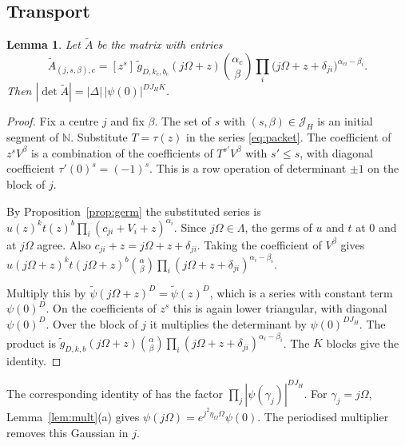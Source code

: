 \documentclass[11pt]{amsart}
\newtheorem{lemma}[theorem]{Lemma}
\theoremstyle{definition}
\theoremstyle{remark}
\numberwithin{equation}{section}
\newcommand{\N}{\mathbb N}
\newcommand{\cJ}{\mathcal J}
\newcommand{\tpsi}{\widetilde\psi}
\newcommand{\tg}{\widetilde g}
\newcommand{\tA}{\widetilde A}
\begin{document}
\subsection{Transport}

\begin{lemma}\label{lem:transport}
Let $\tA$ be the matrix with entries
\[
 \tA_{(j,s,\beta),c}=[z^s]\,\tg_{D,k_c,b_c}(j\Omega+z)\binom{\alpha_c}\beta\prod_i
 \bigl(j\Omega+z+\delta_{ji}\bigr)^{\alpha_{ci}-\beta_i}.
\]
Then $|\det\tA|=|\Delta|\,|\psi(0)|^{DJ_HK}$.
\end{lemma}

\begin{proof}
Fix a centre $j$ and fix $\beta$. The set of $s$ with $(s,\beta)\in\cJ_H$ is an initial segment of $\N$.
Substitute $T=\tau(z)$ in the series \eqref{eq:packet}. The coefficient of $z^sV^\beta$ is a combination of the
coefficients of $T^{s'}V^\beta$ with $s'\le s$, with diagonal coefficient $\tau'(0)^s=(-1)^s$. This is a row
operation of determinant $\pm1$ on the block of $j$.

By Proposition~\ref{prop:germ} the substituted series is
$u(z)^{k}t(z)^{b}\prod_i(c_{ji}+V_i+z)^{\alpha_i}$. Since $j\Omega\in\Lambda$, the germs of $u$ and $t$ at
$0$ and at $j\Omega$ agree. Also $c_{ji}+z=j\Omega+z+\delta_{ji}$. Taking the coefficient of $V^\beta$ gives
$u(j\Omega+z)^kt(j\Omega+z)^b\binom\alpha\beta\prod_i(j\Omega+z+\delta_{ji})^{\alpha_i-\beta_i}$.

Multiply this by $\tpsi(j\Omega+z)^D=\tpsi(z)^D$, which is a series with constant term $\psi(0)^D$. On the
coefficients of $z^s$ this is again lower triangular, with diagonal $\psi(0)^D$. Over the block of $j$ it
multiplies the determinant by $\psi(0)^{DJ_H}$. The product is
$\tg_{D,k,b}(j\Omega+z)\binom\alpha\beta\prod_i(j\Omega+z+\delta_{ji})^{\alpha_i-\beta_i}$. The $K$ blocks
give the identity.
\end{proof}

The corresponding identity of \cite[Lemma~16.1]{ChudnovskyChudnovsky26} has the factor
$\prod_j|\psi(\gamma_j)|^{DJ_H}$. For $\gamma_j=j\Omega$, Lemma~\ref{lem:mult}(a) gives $\psi(j\Omega)=e^{j^2\eta_\Omega\Omega}\psi(0)$. The periodised multiplier
removes this Gaussian in $j$.
\end{document}
